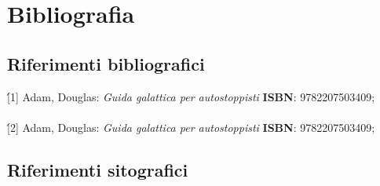 \newpage
\chapter{Bibliografia}
\label{cap:bibliografia}



\section*{Riferimenti bibliografici}
\'[1]  Adam, Douglas: \emph{Guida galattica per autostoppisti} \textbf{ISBN}: 9782207503409;\\
\\
\'[2]  Adam, Douglas: \emph{Guida galattica per autostoppisti} \textbf{ISBN}: 9782207503409;
\section*{Riferimenti sitografici}
\newpage
